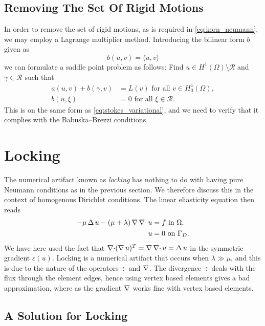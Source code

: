 \subsection{Removing The Set Of Rigid Motions}

In order to remove the set of rigid motions, as is required in
\cref{eq:korn_neumann}, we may employ a Lagrange multiplier method. Introducing
the bilinear form \( b \) given as 
\begin{equation}
    b(u, v) = \langle u, v \rangle
\end{equation}
we can formulate a saddle point problem as follows: Find \( u \in H^1(\Omega)
\setminus \mathcal{R} \) and \( \gamma \in \mathcal{R} \) such that 
\begin{align}
    a(u, v) + b(\gamma, v) &= L(v) \text{ for all } v \in H^1_0(\Omega), \\
    b(u, \xi) &= 0 \text{ for all } \xi \in \mathcal{R}.
\end{align}
This is on the same form as \vref{eq:stokes_variational}, and we need to verify
that it complies with the Babuska--Brezzi conditions.

\section{Locking}

The numerical artifact known as \emph{locking} has nothing to do with having
pure Neumann conditions as in the previous section. We therefore discuss this
in the context of homogenous Dirichlet conditions. The linear eliasticity
equation then reads
\begin{align}
    \label{eq:locking_variational}
    -\mu \operatorname{\mathop{}\!\Delta} u - (\mu + \lambda)\operatorname{\mathop{}\!\nabla}\operatorname{\mathop{}\!\nabla \cdot} u &= f \text{ in } \Omega, \\
    u &= 0 \text{ on } \Gamma_D.
\end{align}
We have here used the fact that \( \operatorname{\mathop{}\!\nabla \cdot} (\operatorname{\mathop{}\!\nabla} u)^T = \operatorname{\mathop{}\!\nabla} \operatorname{\mathop{}\!\nabla \cdot} u = \operatorname{\mathop{}\!\Delta} u\)
in the symmetric gradient \( \varepsilon(u) \). Locking is a numerical artifact
that occurs when \( \lambda \gg \mu \), and this is due to the nature of the
operators \( \div \) and \( \operatorname{\mathop{}\!\nabla} \). The divergence \( \div \) deals with the
flux through the element edges, hence using vertex based elements gives a bad
approximation, where as the gradient \( \operatorname{\mathop{}\!\nabla} \) works fine with vertex based
elements.

\subsection{A Solution for Locking}


